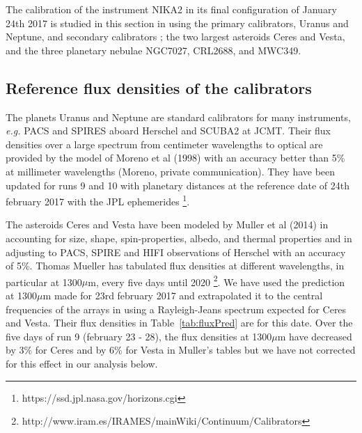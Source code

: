 %


The calibration of the instrument NIKA2 in its final configuration
of January 24th 2017  is studied in this section  in using the 
 primary calibrators, Uranus and Neptune, and secondary calibrators ; the two largest asteroids Ceres and Vesta, and the three
planetary nebulae NGC7027, CRL2688, and MWC349.

\subsection{Reference flux densities of the calibrators}

The planets Uranus and Neptune are standard calibrators for many instruments,
{\it e.g.} PACS and SPIRES aboard Herschel and SCUBA2 at JCMT.
Their flux densities over a large spectrum from centimeter wavelengths to optical
are provided by the model of Moreno et al (1998) with an accuracy better than
5\% at millimeter wavelengths (Moreno, private communication).
They have been updated for runs 9 and 10
with planetary distances at the reference date of 24th february 2017 with 
the JPL ephemerides \footnote{https://ssd.jpl.nasa.gov/horizons.cgi}.


The asteroids Ceres and Vesta have been modeled by Muller et al (2014) in accounting for 
size, shape, spin-properties, albedo, and thermal properties and in adjusting to PACS, SPIRE and HIFI observations
of Herschel with an accuracy of 5\%. 
Thomas Mueller has tabulated flux densities at different wavelengths, in particular at 1300$\mu$m, every five days
until 2020 \footnote{http://www.iram.es/IRAMES/mainWiki/Continuum/Calibrators}.
We have used the prediction at  1300$\mu$m made for  23rd february 2017
and extrapolated it  to the central frequencies of the arrays in using a Rayleigh-Jeans
spectrum expected for Ceres and Vesta. Their flux densities in
Table~\ref{tab:fluxPred} are for this date. Over the five days of  run 9 (february 23 - 28), the
flux densities  at 1300$\mu$m  have decreased by  3\% 
for Ceres and  by 6\%  for Vesta in Muller's tables but we have not corrected for this effect in our analysis below.  


